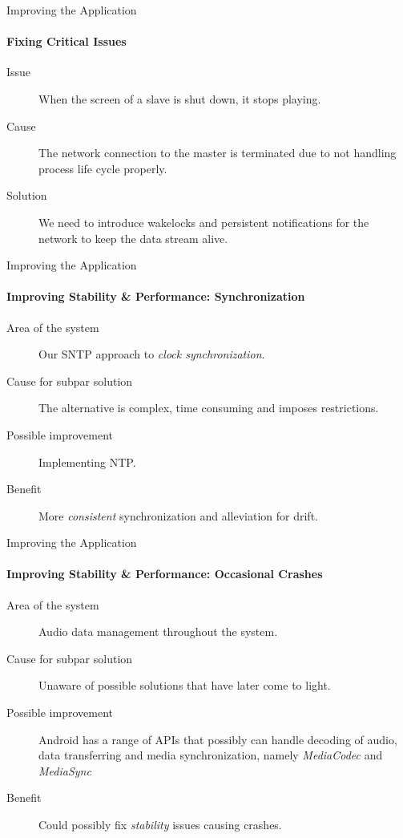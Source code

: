 \begin{frame}{Improving the Application}
    \framesubtitle{Fixing Critical Issues}
    \begin{description}
        \item [Issue] When the screen of a slave is shut down, it stops playing.
        \item [Cause] The network connection to the master is terminated due to not handling process life cycle properly.
        \item [Solution] We need to introduce wakelocks and persistent notifications for the network to keep the data stream alive.
    \end{description}
\end{frame}

\begin{frame}{Improving the Application}
    \framesubtitle{Improving Stability \& Performance: Synchronization}
    \begin{description}
        \item [Area of the system] Our SNTP approach to \textit{clock synchronization}.
        \item [Cause for subpar solution] The alternative is complex, time consuming and imposes restrictions.
        \item [Possible improvement] Implementing NTP.
        \item [Benefit] More \textit{consistent} synchronization and alleviation for drift.
    \end{description}
\end{frame}

\begin{frame}{Improving the Application}
    \framesubtitle{Improving Stability \& Performance: Occasional Crashes}
    \begin{description}
        \item [Area of the system] Audio data management throughout the system.
        \item [Cause for subpar solution] Unaware of possible solutions that have later come to light.
        \item [Possible improvement] Android has a range of APIs that possibly can handle decoding of audio, data transferring and media synchronization, namely \textit{MediaCodec} and \textit{MediaSync}
        \item [Benefit] Could possibly fix \textit{stability} issues causing crashes.
    \end{description}
\end{frame}


